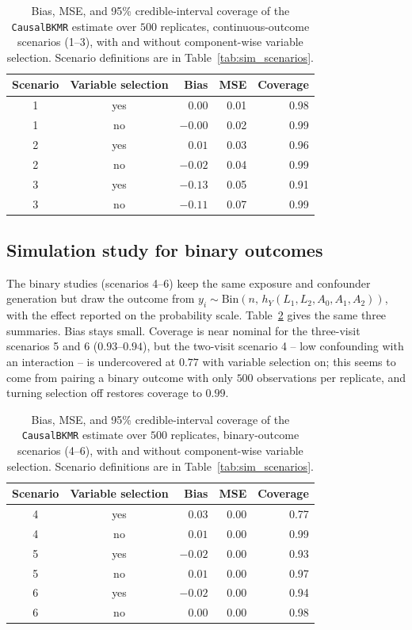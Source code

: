 \documentclass[11pt]{article}
\newcommand{\pkg}[1]{\texttt{#1}}
\begin{document}
\begin{table}[h]
\centering
\caption{Bias, MSE, and 95\% credible-interval coverage of the \pkg{CausalBKMR} estimate over $500$ replicates, continuous-outcome scenarios (1--3), with and without component-wise variable selection. Scenario definitions are in Table~\ref{tab:sim_scenarios}.}
\label{tab:sim_continuous}
\begin{tabular}{cc rrr}
\toprule
Scenario & Variable selection & Bias & MSE & Coverage \\
\midrule
1 & yes & $0.00$  & 0.01 & 0.98 \\
1 & no  & $-0.00$ & 0.02 & 0.99 \\
\midrule
2 & yes & $0.01$  & 0.03 & 0.96 \\
2 & no  & $-0.02$ & 0.04 & 0.99 \\
\midrule
3 & yes & $-0.13$ & 0.05 & 0.91 \\
3 & no  & $-0.11$ & 0.07 & 0.99 \\
\bottomrule
\end{tabular}
\end{table}

\subsection*{Simulation study for binary outcomes}

The binary studies (scenarios 4--6) keep the same exposure and confounder generation but draw the outcome from $y_i \sim \text{Bin}(n,\, h_Y(L_1, L_2, A_0, A_1, A_2))$, with the effect reported on the probability scale. Table~\ref{tab:sim_binary} gives the same three summaries. Bias stays small. Coverage is near nominal for the three-visit scenarios 5 and 6 ($0.93$--$0.94$), but the two-visit scenario 4 -- low confounding with an interaction -- is undercovered at $0.77$ with variable selection on; this seems to come from pairing a binary outcome with only $500$ observations per replicate, and turning selection off restores coverage to $0.99$.

\begin{table}[h]
\centering
\caption{Bias, MSE, and 95\% credible-interval coverage of the \pkg{CausalBKMR} estimate over $500$ replicates, binary-outcome scenarios (4--6), with and without component-wise variable selection. Scenario definitions are in Table~\ref{tab:sim_scenarios}.}
\label{tab:sim_binary}
\begin{tabular}{cc rrr}
\toprule
Scenario & Variable selection & Bias & MSE & Coverage \\
\midrule
4 & yes & $0.03$  & 0.00 & 0.77 \\
4 & no  & $0.01$  & 0.00 & 0.99 \\
\midrule
5 & yes & $-0.02$ & 0.00 & 0.93 \\
5 & no  & $0.01$  & 0.00 & 0.97 \\
\midrule
6 & yes & $-0.02$ & 0.00 & 0.94 \\
6 & no  & $0.00$  & 0.00 & 0.98 \\
\bottomrule
\end{tabular}
\end{table}
\end{document}
